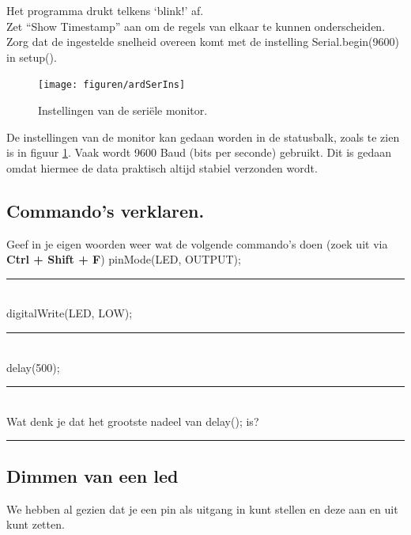 Het programma drukt telkens ‘blink!’ af.\\ 
Zet “Show Timestamp” aan om de regels van elkaar te kunnen onderscheiden.\\ 
Zorg dat de ingestelde snelheid overeen komt met de instelling \textcolor{BurntOrange}{Serial.begin}(9600) in  \textcolor{OliveGreen}{setup}(). 
\begin{figure}[h!]
	\captionsetup{justification=centering}
	\texttt{[image: figuren/ardSerIns]}
	\centering
	\caption{Instellingen van de seriële monitor.}
	\label{fig:arSeIn}
\end{figure}
De instellingen van de monitor kan gedaan worden in de statusbalk, zoals te zien is in figuur \ref{fig:arSeIn}.
Vaak wordt 9600 Baud (bits per seconde) gebruikt. Dit is gedaan omdat hiermee de data praktisch altijd stabiel verzonden wordt.

\subsection{Commando's verklaren.}

Geef in je eigen woorden weer wat de volgende commando’s doen (zoek uit via  \colorbox{mygray}{\textbf{Ctrl + Shift + F}})
\textcolor{BurntOrange}{pinMode}(LED, \textcolor{BlueGreen}{OUTPUT});\\
\vspace{1cm}
\hrule
~\\    
\vspace{1cm}
\textcolor{BurntOrange}{digitalWrite}(LED, \textcolor{BlueGreen}{LOW});\\
\vspace{1cm}
\hrule
~\\    
\vspace{0.8cm}
\textcolor{BurntOrange}{delay}(500);
 \vspace{1cm}
 \hrule
 ~\\    
 Wat denk je dat het grootste nadeel van \textcolor{BurntOrange}{delay}();  is?
 \vspace{1cm}
 \hrule
 
 \subsection{Dimmen van een led}
 
 We hebben al gezien dat je een pin als uitgang in kunt stellen en deze aan en uit kunt zetten.
 
